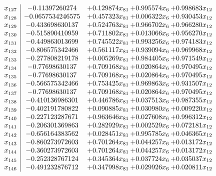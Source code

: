 \documentclass[11pt]{article}
\begin{document}
\[\begin{array}{c| c c@{\hskip 2pt} c@{\hskip 2pt} c@{\hskip 2pt} }
 x_{127}   &  -0.11397260274 & + 0.129874 x_{81} & + 0.995574 x_{6} & + 0.998683 x_{12}\\
 x_{128}   &  -0.0657534246575 & + 0.457323 x_{81} & + 0.006322 x_{6} & + 0.930453 x_{12}\\
 x_{129}   &  -0.433698630137 & + 0.524763 x_{81} & + 0.966702 x_{6} & + 0.966280 x_{12}\\
 x_{130}   &  -0.515890410959 & + 0.711802 x_{81} & + 0.013066 x_{6} & + 0.956270 x_{12}\\
 x_{131}   &  -0.449863013699 & + 0.745522 x_{81} & + 0.993256 x_{6} & + 0.974183 x_{12}\\
 x_{132}   &  -0.806575342466 & + 0.561117 x_{81} & + 0.939094 x_{6} & + 0.969968 x_{12}\\
 x_{133}   &  -0.277808219178 & + 0.005269 x_{81} & + 0.984405 x_{6} & + 0.971549 x_{12}\\
 x_{134}   &  -0.77698630137 & + 0.709168 x_{81} & + 0.020864 x_{6} & + 0.970495 x_{12}\\
 x_{135}   &  -0.77698630137 & + 0.709168 x_{81} & + 0.020864 x_{6} & + 0.970495 x_{12}\\
 x_{136}   &  -0.566575342466 & + 0.753425 x_{81} & + 0.969863 x_{6} & + 0.931507 x_{12}\\
 x_{137}   &  -0.77698630137 & + 0.709168 x_{81} & + 0.020864 x_{6} & + 0.970495 x_{12}\\
 x_{138}   &  -0.410136986301 & + 0.446786 x_{81} & + 0.037513 x_{6} & + 0.987355 x_{12}\\
 x_{139}   &  -0.402191780822 & + 0.090885 x_{81} & + 0.030980 x_{6} & + 0.009220 x_{12}\\
 x_{140}   &  -0.227123287671 & + 0.963646 x_{81} & + 0.027608 x_{6} & + 0.996312 x_{12}\\
 x_{141}   &  -0.206301369863 & + 0.282929 x_{81} & + 0.002529 x_{6} & + 0.072181 x_{12}\\
 x_{142}   &  -0.656164383562 & + 0.028451 x_{81} & + 0.995785 x_{6} & + 0.046365 x_{12}\\
 x_{143}   &  -0.860273972603 & + 0.701264 x_{81} & + 0.044257 x_{6} & + 0.013172 x_{12}\\
 x_{144}   &  -0.360273972603 & + 0.701264 x_{81} & + 0.044257 x_{6} & + 0.013172 x_{12}\\
 x_{145}   &  -0.252328767124 & + 0.345364 x_{81} & + 0.037724 x_{6} & + 0.035037 x_{12}\\
 x_{146}   &  -0.491232876712 & + 0.347998 x_{81} & + 0.029926 x_{6} & + 0.020811 x_{12}\\

\end{array}\]
\end{document}
